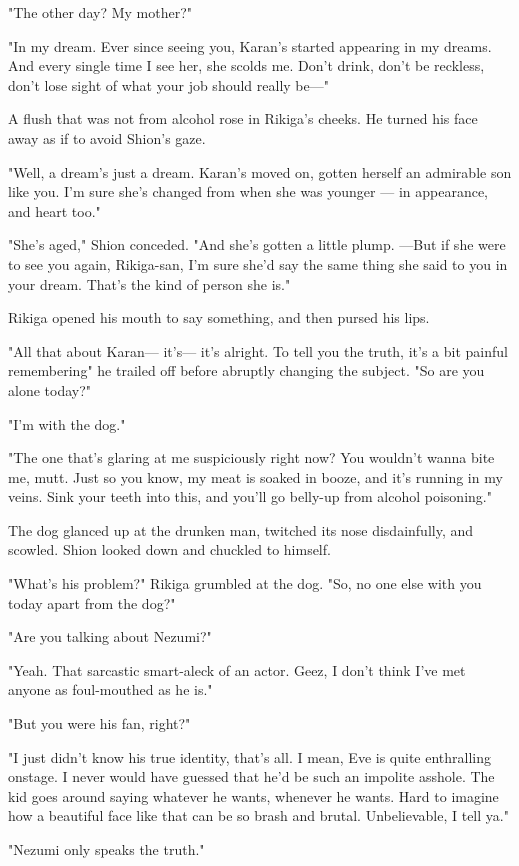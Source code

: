 "The other day? My mother?"

"In my dream. Ever since seeing you, Karan's started appearing in my
dreams. And every single time I see her, she scolds me. Don't drink,
don't be reckless, don't lose sight of what your job should really be---"

A flush that was not from alcohol rose in Rikiga's cheeks. He turned his
face away as if to avoid Shion's gaze.

"Well, a dream's just a dream. Karan's moved on, gotten herself an
admirable son like you. I'm sure she's changed from when she was younger
--- in appearance, and heart too."

"She's aged," Shion conceded. "And she's gotten a little plump. ---But if
she were to see you again, Rikiga-san, I'm sure she'd say the same thing
she said to you in your dream. That's the kind of person she is."

Rikiga opened his mouth to say something, and then pursed his lips.

"All that about Karan--- it's--- it's alright. To tell you the truth, it's a
bit painful remembering\el " he trailed off before abruptly changing the
subject. "So are you alone today?"

"I'm with the dog."

"The one that's glaring at me suspiciously right now? You wouldn't wanna
bite me, mutt. Just so you know, my meat is soaked in booze, and it's
running in my veins. Sink your teeth into this, and you'll go belly-up
from alcohol poisoning."

The dog glanced up at the drunken man, twitched its nose disdainfully,
and scowled. Shion looked down and chuckled to himself.

"What's his problem?" Rikiga grumbled at the dog. "So, no one else with
you today apart from the dog?"

"Are you talking about Nezumi?"

"Yeah. That sarcastic smart-aleck of an actor. Geez, I don't think I've
met anyone as foul-mouthed as he is."

"But you were his fan, right?"

"I just didn't know his true identity, that's all. I mean, Eve is quite
enthralling onstage. I never would have guessed that he'd be such an
impolite asshole. The kid goes around saying whatever he wants, whenever
he wants. Hard to imagine how a beautiful face like that can be so brash
and brutal. Unbelievable, I tell ya."

"Nezumi only speaks the truth."

